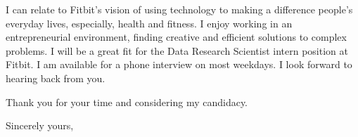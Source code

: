 \documentclass{letter} %
\begin{document}
\begin{letter}
\noindent %
I can relate to Fitbit's vision of using technology to making a difference people's everyday lives, especially, health and fitness. I enjoy working in an entrepreneurial environment, finding creative and efficient solutions to complex problems. I will be a great fit for the Data Research Scientist intern position at Fitbit. I am available for a phone interview on most weekdays. I look forward to hearing back from you.

Thank you for your time and considering my candidacy. 
 
\closing{Sincerely yours,} 
 

 

\end{letter}
\end{document}
